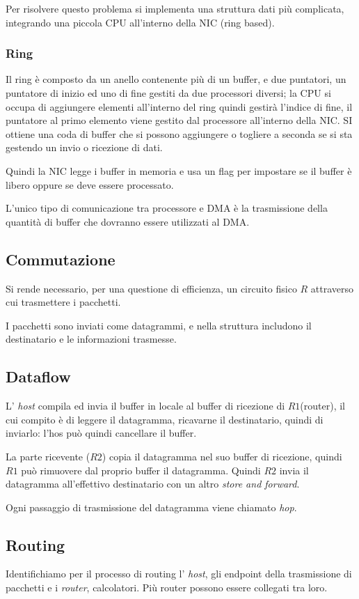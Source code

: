 Per risolvere questo problema si implementa una struttura dati più complicata,
integrando una piccola CPU all'interno della NIC (ring based).

\subsubsection{Ring}
Il ring è composto da un anello contenente più di un buffer, e due puntatori,
un puntatore di inizio ed uno di fine gestiti da due processori diversi;
la CPU si occupa di aggiungere elementi all'interno del ring quindi gestirà
l'indice di fine, il puntatore al primo elemento viene gestito dal processore
all'interno della NIC.
SI ottiene una coda di buffer che si possono aggiungere o togliere a seconda
se si sta gestendo un invio o ricezione di dati.

Quindi la NIC legge i buffer in memoria e usa un flag per impostare se il
buffer è libero oppure se deve essere processato.

L'unico tipo di comunicazione tra processore e DMA è la trasmissione della 
quantità di buffer che dovranno essere utilizzati al DMA.

\subsection{Commutazione}
Si rende necessario, per una questione di efficienza, un circuito fisico $R$
attraverso cui trasmettere i pacchetti.

I pacchetti sono inviati come datagrammi, e nella struttura includono il
destinatario e le informazioni trasmesse.

\subsection{Dataflow}
L' \emph{host} compila ed invia il buffer in locale al buffer di ricezione di
$R1$(router), il cui compito è di leggere il datagramma, ricavarne il
destinatario, quindi di inviarlo: l'hos può quindi cancellare il buffer.

La parte ricevente ($R2$) copia il datagramma nel suo buffer di ricezione,
quindi $R1$ può rimuovere dal proprio buffer il datagramma.
Quindi $R2$ invia il datagramma all'effettivo destinatario con un altro
\emph{store and forward}.

Ogni passaggio di trasmissione del datagramma viene chiamato \emph{hop}.

\subsection{Routing}
Identifichiamo per il processo di routing l' \emph{host}, gli endpoint della
trasmissione di pacchetti e i \emph{router}, calcolatori.
Più router possono essere collegati tra loro.

